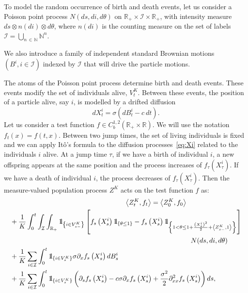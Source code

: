 \documentclass[AHL,Unicode,longabstracts,published]{cedram}
\newcommand{\Io}{\mathcal{I}}
\newcommand*\N{\mathbb{N}}
\newcommand*\R{\mathbb{R}}
\newcommand*\ind{{\mathchoice {\rm 1\mskip-4mu l} {\rm 1\mskip-4mu l} {\rm 1\mskip-4.5mu l} {\rm 1\mskip-5mu l}}}
\begin{document}
To model the random occurrence of birth and death events, let us consider a Poisson point process $N(ds,di,d\theta)$ on $\R_+\times \Io\times \R_+$, with intensity measure $ds\otimes n(di)\otimes d\theta$, where $n(di)$ is the counting measure on the set of labels $\Io=\bigcup_{n\,\in\,\N}\N^n$.


We also introduce a family of independent standard Brownian motions $(B^i, i\in \Io)$ indexed by $\Io$ that will drive the particle motions.

The atoms of the Poisson point process determine birth and death events. These events modify the set of individuals alive, $V^K_t$. Between these events, the position of a particle alive, say $i$, is modelled by a drifted diffusion
\begin{equation}\label{eq:Xi}
dX^i_t=\sigma(dB^i_t-c\ dt).\end{equation}
Let us consider a test function $f \in C^{1,2}_b(\R_+\times \R)$. We will use the notation $f_t(x)=f(t,x)$. Between two jump times, the set of living individuals is fixed and we can apply It\^o's formula to the diffusion processes~\eqref{eq:Xi} related to the individuals $i$ alive. At a jump time $\tau$, if we have a birth of individual $i$, a new offspring appears at the same position and the process increases of $f_\tau(X^i_\tau)$. If we have a death of individual $i$, the process decreases of $f_\tau(X^i_\tau)$. Then the measure-valued population process $Z^K$ acts on the test function $f$ as:
\begin{multline}\label{eq:sde1}
\lefteqn{\left\langle Z^{K}_t,f_t\right\rangle = \left\langle Z^{K}_0,f_0\right\rangle}\\
\begin{aligned}
&+ \frac{1}{K}\int_0^t \int_{\Io}\int_{\R_+}\ind_{\left\{i \in V^K_{s-}\right\}} \left[f_{s}\left(X^i_{s}\right)\ind_{\left\{\theta \leq 1\right\}} - f_{s}\left(X^i_{s}\right) \ind_{\left\{1 < \theta \leq 1+\frac{\left(X^i_s\right)^2}{2}+\left\langle Z_{s-}^{K},1\right\rangle\right\}} \right]\\
&\mkern480mu N(ds, di, d\theta) \\
&+ \frac{1}{K}\sum_{i \in \Io}\int_0^t \ind_{\left\{i \in V^K_s\right\}} \sigma \partial_x f_s\left(X^i_s\right) dB^i_s \\
&+ \frac{1}{K} \sum_{i \in \Io}\int_0^t \ind_{\left\{i \in V^K_s\right\}} \left(\partial_s f_s\left(X^i_s\right) -c\sigma \partial_x f_s\left(X^i_s\right)+\frac{\sigma^2}{2} \partial^2_{xx}f_s\left(X^i_s\right) \right) ds,
\end{aligned}
\end{multline}
\end{document}
